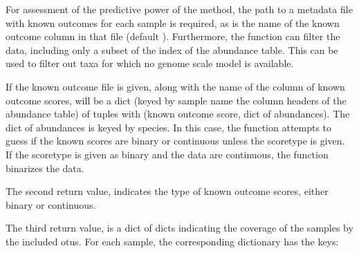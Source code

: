\documentclass[letterpaper,10pt,english]{sphinxmanual}
\begin{document}
\sphinxAtStartPar
For assessment of the predictive power of the method, the path to a metadata file with known outcomes for each sample is required, as is the name of the known outcome column in that file (default ). Furthermore,
the function can filter the data, including only a subset of the index of the abundance table. This can be used to filter out taxa for which no genome scale model is available.

\begin{sphinxVerbatim}[commandchars=\\\{\}]
   

        
\end{sphinxVerbatim}

\sphinxAtStartPar
If the known outcome file is given, along with the name of the column of known outcome scores,  will be a dict (keyed by sample name \sphinxhyphen{} the column headers of the abundance table) of
tuples with (known outcome score, dict of abundances). The dict of abundances is keyed by species. In this case, the function attempts to guess if the known scores are binary or continuous unless the
scoretype is given. If the scoretype is given as binary and the data are continuous, the function binarizes the data.

\sphinxAtStartPar
The second return value,  indicates the type of known outcome scores, either binary or continuous.

\sphinxAtStartPar
The third return value,  is a dict of dicts indicating the coverage of the samples by the included otus. For each sample, the corresponding dictionary has the keys:
\end{document}
